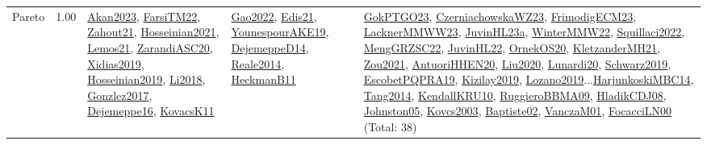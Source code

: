{\begin{longtable}{p{3cm}r>{\raggedright\arraybackslash}p{6cm}>{\raggedright\arraybackslash}p{6cm}>{\raggedright\arraybackslash}p{8cm}}
\index{Pareto}\index{Concepts!Pareto}Pareto &  1.00 & \hyperref[detail:Akan2023]{Akan2023}, \hyperref[detail:FarsiTM22]{FarsiTM22}, \hyperref[detail:Zahout21]{Zahout21}, \hyperref[detail:Hosseinian2021]{Hosseinian2021}, \hyperref[detail:Lemos21]{Lemos21}, \hyperref[detail:ZarandiASC20]{ZarandiASC20}, \hyperref[detail:Xidias2019]{Xidias2019}, \hyperref[detail:Hosseinian2019]{Hosseinian2019}, \hyperref[detail:Li2018]{Li2018}, \hyperref[detail:Gonzlez2017]{Gonzlez2017}, \hyperref[detail:Dejemeppe16]{Dejemeppe16}, \hyperref[detail:KovacsK11]{KovacsK11} & \hyperref[detail:Gao2022]{Gao2022}, \hyperref[detail:Edis21]{Edis21}, \hyperref[detail:YounespourAKE19]{YounespourAKE19}, \hyperref[detail:DejemeppeD14]{DejemeppeD14}, \hyperref[detail:Reale2014]{Reale2014}, \hyperref[detail:HeckmanB11]{HeckmanB11} & \hyperref[detail:GokPTGO23]{GokPTGO23}, \hyperref[detail:CzerniachowskaWZ23]{CzerniachowskaWZ23}, \hyperref[detail:FrimodigECM23]{FrimodigECM23}, \hyperref[detail:LacknerMMWW23]{LacknerMMWW23}, \hyperref[detail:JuvinHL23a]{JuvinHL23a}, \hyperref[detail:WinterMMW22]{WinterMMW22}, \hyperref[detail:Squillaci2022]{Squillaci2022}, \hyperref[detail:MengGRZSC22]{MengGRZSC22}, \hyperref[detail:JuvinHL22]{JuvinHL22}, \hyperref[detail:OrnekOS20]{OrnekOS20}, \hyperref[detail:KletzanderMH21]{KletzanderMH21}, \hyperref[detail:Zou2021]{Zou2021}, \hyperref[detail:AntuoriHHEN20]{AntuoriHHEN20}, \hyperref[detail:Liu2020]{Liu2020}, \hyperref[detail:Lunardi20]{Lunardi20}, \hyperref[detail:Schwarz2019]{Schwarz2019}, \hyperref[detail:EscobetPQPRA19]{EscobetPQPRA19}, \hyperref[detail:Kizilay2019]{Kizilay2019}, \hyperref[detail:Lozano2019]{Lozano2019}...\hyperref[detail:HarjunkoskiMBC14]{HarjunkoskiMBC14}, \hyperref[detail:Tang2014]{Tang2014}, \hyperref[detail:KendallKRU10]{KendallKRU10}, \hyperref[detail:RuggieroBBMA09]{RuggieroBBMA09}, \hyperref[detail:HladikCDJ08]{HladikCDJ08}, \hyperref[detail:Johnston05]{Johnston05}, \hyperref[detail:Kovcs2003]{Kovcs2003}, \hyperref[detail:Baptiste02]{Baptiste02}, \hyperref[detail:VanczaM01]{VanczaM01}, \hyperref[detail:FocacciLN00]{FocacciLN00} (Total: 38)\\

\end{longtable}}
